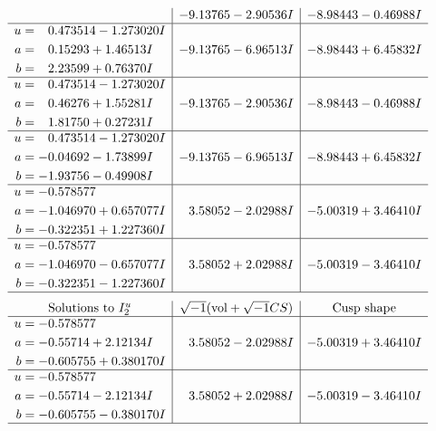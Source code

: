 \documentclass[1p]{elsarticle_modified}
\theoremstyle{definition}
\newcommand{\I}{\sqrt{-1}}
\begin{document}
$$\begin{array}{c|c|c}
 & -9.13765 - 2.90536 I & -8.98443 - 0.46988 I \\ \hline\begin{aligned}
u &= \phantom{-}0.473514 - 1.273020 I \\
a &= \phantom{-}0.15293 + 1.46513 I \\
b &= \phantom{-}2.23599 + 0.76370 I\end{aligned}
 & -9.13765 - 6.96513 I & -8.98443 + 6.45832 I \\ \hline\begin{aligned}
u &= \phantom{-}0.473514 - 1.273020 I \\
a &= \phantom{-}0.46276 + 1.55281 I \\
b &= \phantom{-}1.81750 + 0.27231 I\end{aligned}
 & -9.13765 - 2.90536 I & -8.98443 - 0.46988 I \\ \hline\begin{aligned}
u &= \phantom{-}0.473514 - 1.273020 I \\
a &= -0.04692 - 1.73899 I \\
b &= -1.93756 - 0.49908 I\end{aligned}
 & -9.13765 - 6.96513 I & -8.98443 + 6.45832 I \\ \hline\begin{aligned}
u &= -0.578577\phantom{ +0.000000I} \\
a &= -1.046970 + 0.657077 I \\
b &= -0.322351 + 1.227360 I\end{aligned}
 & \phantom{-}3.58052 - 2.02988 I & -5.00319 + 3.46410 I \\ \hline\begin{aligned}
u &= -0.578577\phantom{ +0.000000I} \\
a &= -1.046970 - 0.657077 I \\
b &= -0.322351 - 1.227360 I\end{aligned}
 & \phantom{-}3.58052 + 2.02988 I & -5.00319 - 3.46410 I\\
 \hline 
 \end{array}$$\newpage$$\begin{array}{c|c|c}  
\text{Solutions to }I^u_{2}& \I (\text{vol} + \sqrt{-1}CS) & \text{Cusp shape}\\
 \hline 
\begin{aligned}
u &= -0.578577\phantom{ +0.000000I} \\
a &= -0.55714 + 2.12134 I \\
b &= -0.605755 + 0.380170 I\end{aligned}
 & \phantom{-}3.58052 - 2.02988 I & -5.00319 + 3.46410 I \\ \hline\begin{aligned}
u &= -0.578577\phantom{ +0.000000I} \\
a &= -0.55714 - 2.12134 I \\
b &= -0.605755 - 0.380170 I\end{aligned}
 & \phantom{-}3.58052 + 2.02988 I & -5.00319 - 3.46410 I\\
 \hline 
 \end{array}$$\newpage\newpage\renewcommand{\arraystretch}{1}
\end{document}

